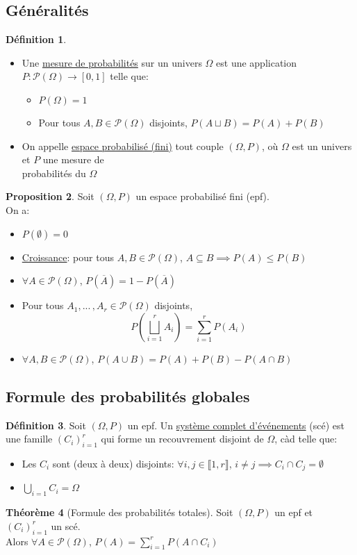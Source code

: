 \documentclass[10pt,a4paper]{article}
\theoremstyle{definition}
\newtheorem{proposition}{Proposition}[section]
\newtheorem{theorem}[proposition]{Théorème}
\newtheorem{definition}[proposition]{Définition}
\begin{document}
\subsection{Généralités}
\begin{definition}
\hfill
\begin{itemize}
\item Une \uline{mesure de probabilités} sur un univers $\Omega$ est une application $P: \mathcal{P}(\Omega) \to [0, 1]$ telle que:
\begin{itemize}
\item $P(\Omega) = 1$
\item Pour tous $A, B \in \mathcal{P}(\Omega)$ disjoints, $P(A \sqcup B) = P(A) + P(B)$
\end{itemize}
\item On appelle \uline{espace probabilisé (fini)} tout couple $(\Omega, P)$, où $\Omega$ est un univers et $P$ une mesure de \\
probabilités du $\Omega$
\end{itemize}
\end{definition}
\begin{proposition}
Soit $(\Omega, P)$ un espace probabilisé fini (epf). \\
On a:
\begin{itemize}
\item $P(\emptyset) = 0$
\item \uline{Croissance}: pour tous $A, B \in \mathcal{P}(\Omega)$, $A \subseteq B \implies P(A) \leq P(B)$
\item $\forall A \in \mathcal{P}(\Omega)$, $P(\overline{A}) = 1 - P(\overline{A})$
\item Pour tous $A_1, ...\,, A_r \in \mathcal{P}(\Omega)$ disjoints, \[P\left( \bigsqcup\limits_{i = 1}^r A_i \right) = \sum\limits_{i = 1}^r P(A_i)\]
\item $\forall A, B \in \mathcal{P}(\Omega)$, $P(A \cup B) = P(A) + P(B) - P(A \cap B)$
\end{itemize}
\end{proposition}

\subsection{Formule des probabilités globales}
\begin{definition}
Soit $(\Omega, P)$ un epf.
Un \uline{système complet d'événements} (scé) est une famille $(C_i)_{i = 1}^r$ qui forme un recouvrement disjoint de $\Omega$, càd telle que:
\begin{itemize}
\item Les $C_i$ sont (deux à deux) disjoints: $\forall i, j \in \llbracket 1, r \rrbracket$, $i \neq j \implies C_i \cap C_j = \emptyset$
\item $\bigcup\limits_{i = 1} C_i = \Omega$
\end{itemize}
\end{definition}
\begin{theorem}[Formule des probabilités totales]
Soit $(\Omega, P)$ un epf et $(C_i)_{i = 1}^r$ un scé. \\
Alors $\forall A \in \mathcal{P}(\Omega)$, $P(A) = \sum\limits_{i = 1}^r P(A \cap C_i)$
\end{theorem}
\end{document}
